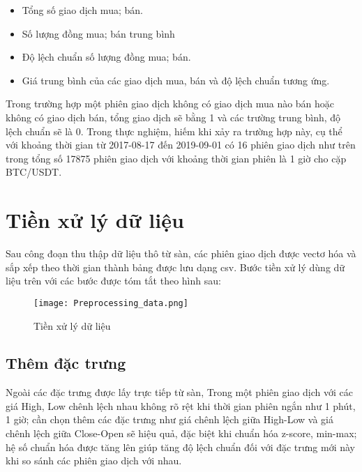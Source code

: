 \begin{itemize}
    \item Tổng số giao dịch mua; bán.
    \item Số lượng đồng mua; bán trung bình
    \item Độ lệch chuẩn số lượng đồng mua; bán.
    \item Giá trung bình của các  giao dịch mua, bán và độ lệch chuẩn tương ứng.
\end{itemize}
Trong trường hợp một phiên giao dịch không có giao dịch mua nào bán hoặc không có giao dịch bán, tổng giao dịch sẽ bằng 1 và các trường trung bình, độ lệch chuẩn sẽ là 0. Trong thực nghiệm, hiếm khi xảy ra trường hợp này, cụ thể với khoảng thời gian từ 2017-08-17 đến 2019-09-01 có 16 phiên giao dịch như trên trong tổng số  17875 phiên giao dịch với khoảng thời gian phiên là 1 giờ cho cặp BTC/USDT.\\


\section{Tiền xử lý dữ liệu}
Sau công đoạn thu thập dữ liệu thô từ sàn, các phiên giao dịch được vectơ hóa và sắp xếp theo thời gian thành bảng được lưu dạng csv. Bước tiền xử lý dùng dữ liệu trên với các bước được tóm tắt theo hình sau:
\begin{figure}[hbt!]
	\center	\texttt{[image: Preprocessing\_data.png]}
	\caption{Tiền xử lý dữ liệu}
	\label{fig:Preprocessing_data}

\end{figure}


\subsection{Thêm đặc trưng}
Ngoài các đặc trưng được lấy trực tiếp từ sàn, Trong một phiên giao dịch với các giá High, Low chênh lệch nhau không rõ rệt khi thời gian phiên ngắn như 1 phút, 1 giờ; cần chọn thêm các đặc trưng như giá chênh lệch giữa High-Low và giá chênh lệch giữa Close-Open sẽ hiệu quả, đặc biệt khi chuẩn hóa z-score, min-max; hệ số chuẩn hóa được tăng lên giúp tăng độ lệch chuẩn đối với đặc trưng mới này khi so sánh các phiên giao dịch với nhau.
